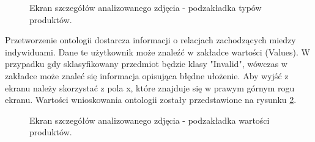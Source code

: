 {\begin{figure}[h]
	\caption{Ekran szczegółów analizowanego zdjęcia - podzakładka typów produktów.}
	\label{fig:typesView}	
\end{figure}
Przetworzenie ontologii dostarcza informacji o relacjach zachodzących miedzy indywiduami. Dane te użytkownik może znaleźć w zakładce wartości (Values). W przypadku gdy sklasyfikowany przedmiot będzie klasy "Invalid", wówczas w zakładce może znaleć się informacja opisująca błędne ułożenie.  Aby wyjść z ekranu należy skorzystać z pola x, które znajduje się w prawym górnym rogu ekranu. Wartości wnioskowania ontologii zostały przedstawione na rysunku \ref{fig:details}.
\newpage
\begin{figure}[h]
	\centering
	\quad
	\caption{Ekran szczegółów analizowanego zdjęcia - podzakładka wartości produktów.}
	\label{fig:details}
\end{figure}
}

